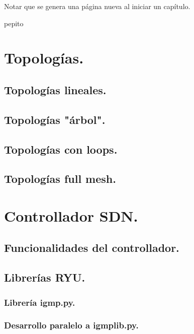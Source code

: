 \documentclass[12pt,a4paper,oneside]{book}
\begin{document}
Notar que se genera una página nueva al iniciar un capítulo.

pepito

\section{Topologías.}
\label{topologias}

\subsection{Topologías lineales.}
\label{topos lineales}

\subsection{Topologías "árbol".}
\label{topos arbol}

\subsection{Topologías con loops.}
\label{topos loops}


\subsection{Topologías full mesh.}
\label{topos full mesh}


\section{Controllador SDN.}

\subsection{Funcionalidades del controllador.}

\subsection{Librerías RYU.}

\subsubsection{Librería igmp.py.}

\subsubsection{Desarrollo paralelo a igmplib.py.}
\end{document}
